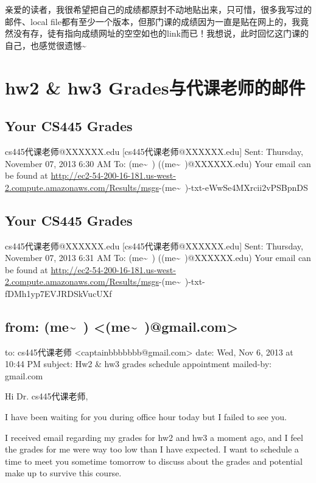 \documentclass[12pt]{book}
\begin{document}
亲爱的读者，我很希望把自己的成绩都原封不动地贴出来，只可惜，很多我写过的邮件、local file都有至少一个版本，但那门课的成绩因为一直是贴在网上的，我竟然没有存，徒有指向成绩网址的空空如也的link而已！我想说，此时回忆这门课的自己，也感觉很遗憾\textasciitilde{}~

\chapter{hw2 \& hw3 Grades与代课老师的邮件}
\label{sec-41}

\section{Your CS445 Grades}
\label{sec-41-1}
cs445代课老师@XXXXXX.edu [cs445代课老师@XXXXXX.edu]
Sent:        Thursday, November 07, 2013 6:30 AM
To:        
 (me\textasciitilde{}~) ((me\textasciitilde{}~)@XXXXXX.edu)
Your email can be found at \url{http://ec2-54-200-16-181.us-west-2.compute.amazonaws.com/Results/msgs}-(me\textasciitilde{}~)-txt-eWwSe4MXrcii2vPSBpnDS

\section{Your CS445 Grades}
\label{sec-41-2}
cs445代课老师@XXXXXX.edu [cs445代课老师@XXXXXX.edu]
Sent:        Thursday, November 07, 2013 6:31 AM
To:        
 (me\textasciitilde{}~) ((me\textasciitilde{}~)@XXXXXX.edu)
Your email can be found at \url{http://ec2-54-200-16-181.us-west-2.compute.amazonaws.com/Results/msgs}-(me\textasciitilde{}~)-txt-fDMh1yp7EVJRDSkVucUXf

\section{from:         (me\textasciitilde{}~) <(me\textasciitilde{}~)@gmail.com>}
\label{sec-41-3}
to:         cs445代课老师 <captainbbbbbbb@gmail.com>
date:         Wed, Nov 6, 2013 at 10:44 PM
subject:         Hw2 \& hw3 grades  schedule appointment
mailed-by:         gmail.com

Hi Dr. cs445代课老师, 

I have been waiting for you during office hour today but I failed to see you. 

I received email regarding my grades for hw2 and hw3 a moment ago, and I feel the grades for me were way too low than I have expected. I want to schedule a time to meet you sometime tomorrow to discuss about the grades and potential make up to survive this course. 
\end{document}
